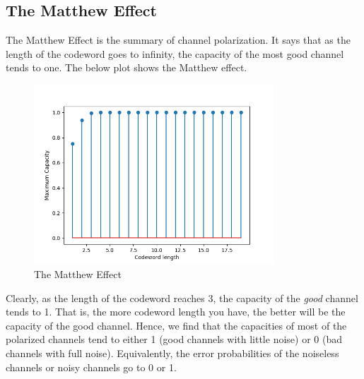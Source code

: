 \documentclass{article}
\begin{document}
\subsection{The Matthew Effect}
The Matthew Effect is the summary of channel polarization. It says that as the length of the codeword goes to infinity, the capacity of the most good channel tends to one. The below plot shows the Matthew effect.
\begin{figure}[H]
\centering
\includegraphics[width=0.8\textwidth, height=0.4\textheight]{matthew.png}
\caption{The Matthew Effect}
\end{figure}
Clearly, as the length of the codeword reaches 3, the capacity of the \textit{good} channel tends to 1. That is, the more codeword length you have, the better will be the capacity of the good channel. Hence, we find that the capacities of most of the polarized channels tend to either 1 (good channels with little noise) or 0 (bad channels with full noise). Equivalently, the error probabilities of the noiseless channels or noisy channels go to 0 or 1.
\end{document}
